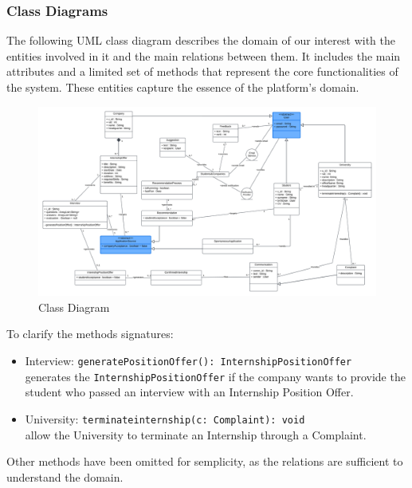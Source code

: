 \subsubsection{Class Diagrams}
The following UML class diagram describes the domain of our interest with the entities involved in it and the main relations between them. It includes the main attributes and a limited set of methods that represent the core functionalities of the system. These entities capture the essence of the platform's domain.
\begin{figure}[H]
    \centering
    \includegraphics[width=\linewidth]{Latex/Images/ClassDiagram2.1.png}
    \caption{Class Diagram}
    \label{fig:ClassDiagram}
\end{figure}
To clarify the methods signatures:
\begin{itemize}
    \item Interview: \verb|generatePositionOffer(): InternshipPositionOffer| \\generates the \verb|InternshipPositionOffer| if the company wants to provide the student who passed an interview with an Internship Position Offer. 
    \item University: \verb|terminateinternship(c: Complaint): void| \\allow the University to terminate an Internship through a Complaint.
\end{itemize}
Other methods have been omitted for semplicity, as the relations are sufficient to understand the domain. 
\clearpage
